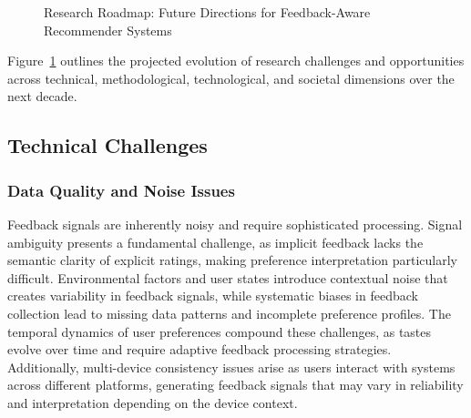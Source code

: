 \begin{figure}[ht]
\caption{Research Roadmap: Future Directions for Feedback-Aware Recommender Systems}
\label{fig:research_roadmap}
\end{figure}

Figure~\ref{fig:research_roadmap} outlines the projected evolution of research challenges and opportunities across technical, methodological, technological, and societal dimensions over the next decade.

\subsection{Technical Challenges}

\subsubsection{Data Quality and Noise Issues}

Feedback signals are inherently noisy and require sophisticated processing. Signal ambiguity presents a fundamental challenge, as implicit feedback lacks the semantic clarity of explicit ratings, making preference interpretation particularly difficult. Environmental factors and user states introduce contextual noise that creates variability in feedback signals, while systematic biases in feedback collection lead to missing data patterns and incomplete preference profiles. The temporal dynamics of user preferences compound these challenges, as tastes evolve over time and require adaptive feedback processing strategies. Additionally, multi-device consistency issues arise as users interact with systems across different platforms, generating feedback signals that may vary in reliability and interpretation depending on the device context.

